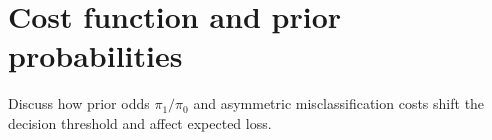 \section{Cost function and prior probabilities}

Discuss how prior odds $\pi_1/\pi_0$ and asymmetric misclassification costs shift the decision threshold and affect expected loss.
